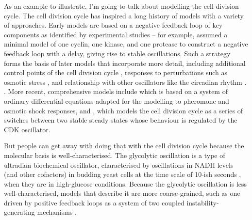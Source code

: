 As an example to illustrate, I'm going to talk about modelling the cell division cycle.
The cell division cycle has inspired a long history of models with a variety of approaches.
Early models are based on a negative feedback loop of key components as identified by experimental studies -- for example, \textcite{goldbeterMinimalCascadeModel1991} assumed a minimal model of one cyclin, one kinase, and one protease to construct a negative feedback loop with a delay, giving rise to stable oscillations.
Such a strategy forms the basis of later models that incorporate more detail, including additional control points of the cell division cycle \parencite{chenIntegrativeAnalysisCell2004}, responses to perturbations such as osmotic stress \parencite{adroverTimeDependentQuantitativeMulticomponent2011}, and relationship with other oscillators like the circadian rhythm \parencite{gerardEntrainmentMammalianCell2012, charvinForcedPeriodicExpression2009, droinLowdimensionalDynamicsTwo2019}. \parencite{adlerYeastCellCycle2022}.
More recent, comprehensive models include \textcite{adlerYeastCellCycle2022} which is based on a system of ordinary differential equations adapted for the modelling to pheromone and osmotic shock responses, and \textcite{novakMitoticKinaseOscillation2022}, which models the cell division cycle as a series of switches between two stable steady states whose behaviour is regulated by the CDK oscillator.

But people can get away with doing that with the cell division cycle because the molecular basis is well-characterised.
The glycolytic oscillation is a type of ultradian biochemical oscillator, characterised by oscillations in NADH levels (and other cofactors) in budding yeast cells at the time scale of 10-ish seconds \parencite{doddLiveCellImaging2017, lloydSaccharomycesCerevisiaeOscillatory2019, olsenOscillationsYeastGlycolysis2021}, when they are in high-glucose conditions.
Because the glycolytic oscillation is less well-characterised, models that describe it are more coarse-grained, such as one driven by positive feedback loops as a system of two coupled instability-generating mechanisms \parencite{goldbeterMultisynchronizationOtherPatterns}. %

